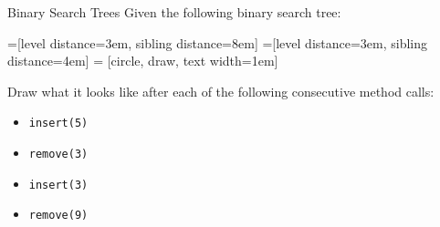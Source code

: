\documentclass[9pt]{beamer}
\begin{document}
\begin{frame}[fragile]{Binary Search Trees}
  Given the following binary search tree:

  =[level distance=3em, sibling distance=8em]
  =[level distance=3em, sibling distance=4em]
   = [circle, draw, text width=1em]


  Draw what it looks like after each of the following consecutive method
  calls:
  \begin{itemize}
    \item
      {\tt insert(5)}
    \item
      {\tt remove(3)}
    \item
      {\tt insert(3)}
    \item
      {\tt remove(9)}
  \end{itemize}
\end{frame}
\end{document}
